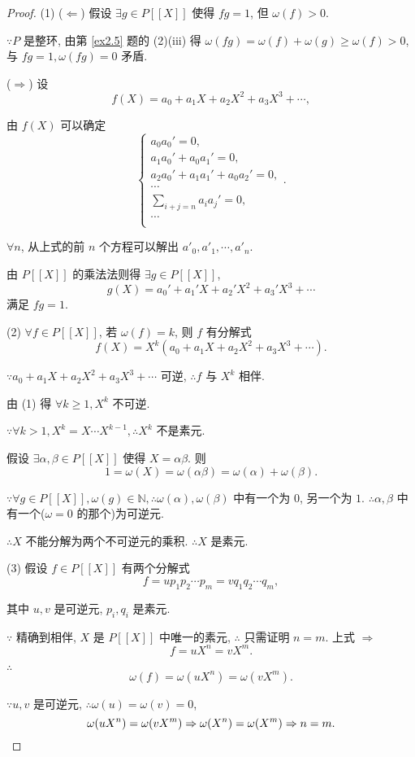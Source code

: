 \documentclass[UTF8]{ctexart}
\begin{document}
\begin{proof}
    (1) ($\Leftarrow$) 假设 $\exists g\in P[[X]]$ 使得 $fg=1$, 但 $\omega(f)>0$.

    $\because P$ 是整环, 由第 \ref{ex2.5} 题的 (2)(iii) 得 $\omega(fg)=\omega(f)+\omega(g)\geq\omega(f)>0$, 与 $fg=1,\omega(fg)=0$ 矛盾.

    ($\Rightarrow$) 设
    \[f(X)=a_0+a_1X+a_2X^2+a_3X^3+\cdots,\]

    由 $f(X)$ 可以确定
    \[\begin{cases}
        a_0a_0'=0, \\
        a_1a_0'+a_0a_1'=0, \\
        a_2a_0'+a_1a_1'+a_0a_2'=0, \\
        \cdots \\
        \sum\limits_{i+j=n}a_ia_j'=0, \\
        \cdots \\
    \end{cases}.\]

    $\forall n$, 从上式的前 $n$ 个方程可以解出 $a'_0,a'_1,\cdots,a'_n$.

    由 $P[[X]]$ 的乘法法则得 $\exists g\in P[[X]]$,
    \[g(X)=a_0'+a_1'X+a_2'X^2+a_3'X^3+\cdots\]
    满足 $fg=1$.

    (2) $\forall f\in P[[X]]$, 若 $\omega(f)=k$, 则 $f$ 有分解式
    \[f(X)=X^k(a_0+a_1X+a_2X^2+a_3X^3+\cdots).\]

    $\because a_0+a_1X+a_2X^2+a_3X^3+\cdots$ 可逆, $\therefore f$ 与 $X^k$ 相伴.

    由 (1) 得 $\forall k\geq1,X^k$ 不可逆.

    $\because\forall k>1,X^k=X\cdots X^{k-1},\therefore X^k$ 不是素元.

    假设 $\exists\alpha,\beta\in P[[X]]$ 使得 $X=\alpha\beta$. 则
    \[1=\omega(X)=\omega(\alpha\beta)=\omega(\alpha)+\omega(\beta).\]

    $\because\forall g\in P[[X]],\omega(g)\in\mathbb{N},\therefore\omega(\alpha),\omega(\beta)$ 中有一个为 $0$, 另一个为 $1$. $\therefore\alpha,\beta$ 中有一个($\omega=0$ 的那个)为可逆元.

    $\therefore X$ 不能分解为两个不可逆元的乘积. $\therefore X$ 是素元.

    (3) 假设 $f\in P[[X]]$ 有两个分解式
    \[f=up_1p_2\cdots p_m=vq_1q_2\cdots q_m,\]

    其中 $u,v$ 是可逆元, $p_i,q_i$ 是素元.

    $\because$ 精确到相伴, $X$ 是 $P[[X]]$ 中唯一的素元, $\therefore$ 只需证明 $n=m$. 上式 $\Rightarrow$
    \[f=uX^n=vX^m.\]

    $\therefore$
    \[\omega(f)=\omega(uX^n)=\omega(vX^m).\]

    $\because u,v$ 是可逆元, $\therefore\omega(u)=\omega(v)=0$,
    \[\omega(uX^n)=\omega(vX^m)\Rightarrow\omega(X^n)=\omega(X^m)\Rightarrow n=m.\qedhere\]
\end{proof}
\end{document}
